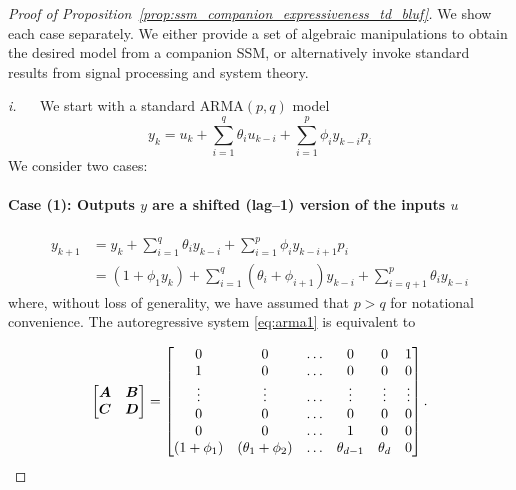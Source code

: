 \begin{proof}[Proof of Proposition~\ref{prop:ssm_companion_expressiveness_td_bluf}]
%
We show each case separately. We either provide a set of algebraic manipulations to obtain the desired model from a companion SSM, or alternatively invoke standard results from signal processing and system theory.

    

 
\textit{i.} \fcircle[fill=green!30]{3pt}~~ We start with a standard $\text{ARMA}(p,q)$ model
%
\[
y_k = u_k + \sum_{i=1}^q \theta_i u_{k-i} + \sum_{i=1}^p \phi_i y_{k-i} p_i
\]
%
We consider two cases: 

\paragraph{Case (1): Outputs $y$ are a shifted (lag--1) version of the inputs $u$}
%
\begin{equation}\label{eq:arma1}
    \begin{aligned}
        y_{k+1} &= y_k + \sum_{i=1}^q \theta_i y_{k-i} + \sum_{i=1}^p \phi_i y_{k-i+1} p_i \\
        &= (1 + \phi_1 y_k) + \sum_{i=1}^{q} (\theta_i + \phi_{i+1}) y_{k-i} + \sum_{i=q+1}^{p} \theta_i y_{k-i}
    \end{aligned}
\end{equation}
%
where, without loss of generality, we have assumed that $p > q$ for notational convenience. The autoregressive system \eqref{eq:arma1} is equivalent to

\[
%
\begin{bmatrix}\zA & \zB \\ \zC & \zD\end{bmatrix} = \begin{bmatrix}0 & 0 & \dots & 0 & 0  & 1 \\ 1 & 0 & \dots & 0 & 0 & 0 \\ \vdots & \vdots & \dots & \vdots & \vdots & \vdots \\ 0 & 0 & \dots & 0 & 0 & 0 \\ 0 & 0 & \dots & 1 & 0 & 0 \\ (1 + \phi_1) & (\theta_1 + \phi_{2}) & \dots & \theta_{d-1} & \theta_d & 0 \end{bmatrix}.
%
\]


\end{proof}
